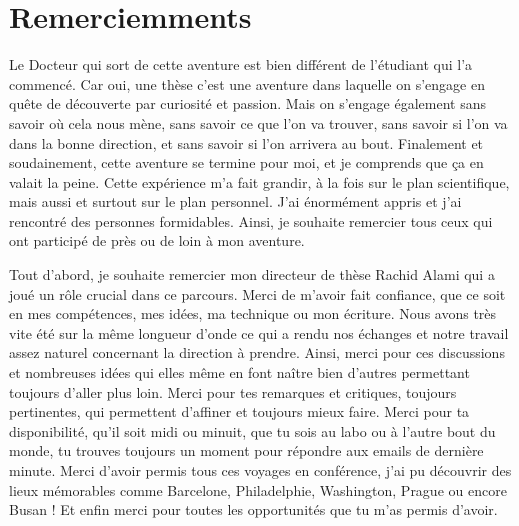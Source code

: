 \section*{Remerciemments}
 




Le Docteur qui sort de cette aventure est bien différent de l'étudiant qui l'a commencé. Car oui, une thèse c'est une aventure dans laquelle on s'engage en quête de découverte par curiosité et passion.
Mais on s'engage également sans savoir où cela nous mène, sans savoir ce que l'on va trouver, sans savoir si l'on va dans la bonne direction, et sans savoir si l'on arrivera au bout.
Finalement et soudainement, cette aventure se termine pour moi, et je comprends que ça en valait la peine. 
Cette expérience m'a fait grandir, à la fois sur le plan scientifique, mais aussi et surtout sur le plan personnel.
J'ai énormément appris et j'ai rencontré des personnes formidables.
Ainsi, je souhaite remercier tous ceux qui ont participé de près ou de loin à mon aventure.



Tout d'abord, je souhaite remercier mon directeur de thèse Rachid Alami qui a joué un rôle crucial dans ce parcours.
Merci de m'avoir fait confiance, que ce soit en mes compétences, mes idées, ma technique ou mon écriture.
Nous avons très vite été sur la même longueur d'onde ce qui a rendu nos échanges et notre travail assez naturel concernant la direction à prendre.
Ainsi, merci pour ces discussions et nombreuses idées qui elles même en font naître bien d'autres permettant toujours d'aller plus loin. 
Merci pour tes remarques et critiques, toujours pertinentes, qui permettent d'affiner et toujours mieux faire.
Merci pour ta disponibilité, qu'il soit midi ou minuit, que tu sois au labo ou à l'autre bout du monde, tu trouves toujours un moment pour répondre aux emails de dernière minute.
Merci d'avoir permis tous ces voyages en conférence, j'ai pu découvrir des lieux mémorables comme Barcelone, Philadelphie, Washington, Prague ou encore Busan ! 
Et enfin merci pour toutes les opportunités que tu m'as permis d'avoir.


